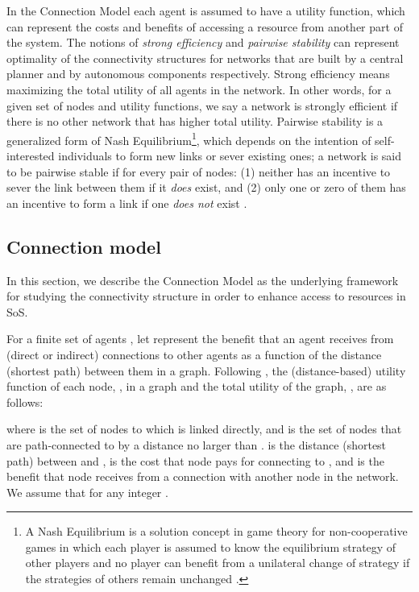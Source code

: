 \documentclass[journal,onecolumn]{IEEEtran}
\theoremstyle{plain}
\begin{document}
In the Connection Model each agent is assumed to have a utility function, which can represent the costs and benefits of accessing a resource from another part of the system. The notions of \textit{strong efficiency} and \textit{pairwise stability} can represent optimality of the connectivity structures for networks that are built by a central planner and by autonomous components respectively. Strong efficiency means maximizing the total utility of all agents in the network. In other words, for a given set of nodes and utility functions, we say a network is strongly efficient if there is no other network that has higher total utility. Pairwise stability is a generalized form of Nash Equilibrium\footnote{A Nash Equilibrium is a solution concept in game theory for non-cooperative games in which each player is assumed to know the equilibrium strategy of other players and no player can benefit from a unilateral change of strategy if the strategies of others remain unchanged \citep{osborne1994course}.}, which depends on the intention of self-interested individuals to form new links or sever existing ones; a network is said to be pairwise stable if for every pair of nodes: (1) neither has an incentive to sever the link between them if it \textit{does} exist, and (2) only one or zero of them has an incentive to form a link if one \textit{does not} exist \citep{jackson1996strategic}.

\subsection{Connection model}

In this section, we describe the Connection Model as the underlying framework for studying the connectivity structure in order to enhance access to resources in SoS.

For a finite set of agents 
, let  
represent the benefit that an agent receives from (direct or indirect) connections to other agents as a function of the distance (shortest path) between them in a graph. Following \cite{jackson1996strategic}, the (distance-based) utility function of each node, , in a graph  and the total utility of the graph, , are as follows:

 

where  is the set of nodes to which  is linked directly, and  is the set of nodes that are path-connected to  by a distance no larger than .  is the distance (shortest path) between  and ,  is the cost that node  pays for connecting to , and  is the benefit that node  receives from a connection with another node in the network. We assume that  for any integer . 
\end{document}
